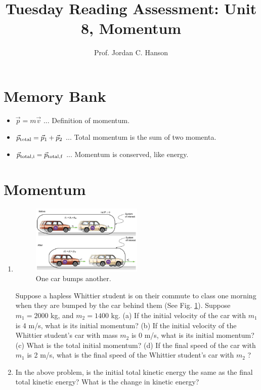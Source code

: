 \documentclass{article}
\begin{document}
\title{Tuesday Reading Assessment: Unit 8, Momentum}
\author{Prof. Jordan C. Hanson}

\maketitle

\section{Memory Bank}

\begin{itemize}
\item $\vec{p} = m\vec{v}$ ... Definition of momentum.
\item $\vec{p}_{\rm total} = \vec{p}_1 + \vec{p}_2$ ... Total momentum is the sum of two momenta.
\item $\vec{p}_{\rm total,i} = \vec{p}_{\rm total,f}$ ... Momentum is conserved, like energy.
\end{itemize}

\section{Momentum}

\begin{enumerate}
\item
\begin{figure}[ht]
\centering
\includegraphics[width=0.5\textwidth]{cars.png}
\caption{\label{fig:cars} One car bumps another.}
\end{figure}
Suppose a hapless Whittier student is on their commute to class one morning when they are bumped by the car behind them (See Fig. \ref{fig:cars}).  Suppose $m_1 = 2000$ kg, and $m_2 = 1400$ kg.  (a) If the initial velocity of the car with $m_1$ is 4 m/s, what is its initial momentum? (b) If the initial velocity of the Whittier student's car with mass $m_2$ is 0 m/s, what is its initial momentum? (c) What is the total initial momentum? (d) If the final speed of the car with $m_1$ is 2 m/s, what is the final speed of the Whittier student's car with $m_2$ ? \\ \vspace{2cm}
\item In the above problem, is the initial total kinetic energy the same as the final total kinetic energy?  What is the change in kinetic energy?
\end{enumerate}
\end{document}
